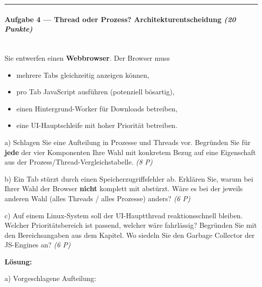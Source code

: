 \documentclass[11pt, a4paper]{article}
\begin{document}
\noindent\textcolor{rulegray}{\rule{\linewidth}{0.4pt}}


\paragraph{Aufgabe 4 — Thread oder Prozess? Architekturentscheidung \textit{(20 Punkte)}}\mbox{}\\[2pt]

Sie entwerfen einen \textbf{Webbrowser}. Der Browser muss

\begin{itemize}
  \item mehrere Tabs gleichzeitig anzeigen können,
  \item pro Tab JavaScript ausführen (potenziell bösartig),
  \item einen Hintergrund-Worker für Downloads betreiben,
  \item eine UI-Hauptschleife mit hoher Priorität betreiben.
\end{itemize}

a) Schlagen Sie eine Aufteilung in Prozesse und Threads vor. Begründen Sie für \textbf{jede} der vier Komponenten Ihre Wahl mit konkretem Bezug auf eine Eigenschaft aus der Prozess/Thread-Vergleichstabelle. \textit{(8 P)}


b) Ein Tab stürzt durch einen Speicherzugriffsfehler ab. Erklären Sie, warum bei Ihrer Wahl der Browser \textbf{nicht} komplett mit abstürzt. Wäre es bei der jeweils anderen Wahl (alles Threads / alles Prozesse) anders? \textit{(6 P)}


c) Auf einem Linux-System soll der UI-Hauptthread reaktionsschnell bleiben. Welcher Prioritätsbereich ist passend, welcher wäre fahrlässig? Begründen Sie mit den Bereichsangaben aus dem Kapitel. Wo siedeln Sie den Garbage Collector der JS-Engines an? \textit{(6 P)}


\textbf{Lösung:}


a) Vorgeschlagene Aufteilung:
\end{document}
